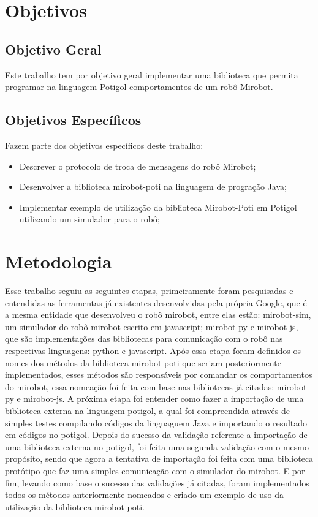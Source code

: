 \section{Objetivos}

\subsection{Objetivo Geral}

Este trabalho tem por objetivo geral implementar uma biblioteca que permita
programar na linguagem Potigol comportamentos de um robô Mirobot.

\subsection{Objetivos Específicos}

Fazem parte dos objetivos específicos deste trabalho:

\begin{itemize} \item Descrever o protocolo de troca de mensagens do robô
    Mirobot; \item Desenvolver a biblioteca mirobot-poti na linguagem de
    progração Java; \item Implementar exemplo de utilização da biblioteca
      Mirobot-Poti em Potigol utilizando um simulador para o robô;
\end{itemize}


\section{Metodologia}

Esse trabalho seguiu as seguintes etapas, primeiramente foram pesquisadas e
entendidas as ferramentas já existentes desenvolvidas pela própria Google, que
é a mesma entidade que desenvolveu o robô mirobot, entre elas estão:
mirobot-sim, um simulador do robô mirobot escrito em javascript; mirobot-py e
mirobot-js, que são implementações das bibliotecas para comunicação com o robô
nas respectivas linguagens: python e javascript. Após essa etapa foram
definidos os nomes dos métodos da biblioteca mirobot-poti que seriam
posteriormente implementados, esses métodos são responsáveis por comandar os
comportamentos do mirobot, essa nomeação foi feita com base nas bibliotecas já
citadas: mirobot-py e mirobot-js. A próxima etapa foi entender como fazer a
importação de uma biblioteca externa na linguagem potigol, a qual foi
compreendida através de simples testes compilando códigos da linguaguem Java e
importando o resultado em códigos no potigol. Depois do sucesso da validação
referente a importação de uma biblioteca externa no potigol, foi feita uma
segunda validação com o mesmo propósito, sendo que agora a tentativa de
importação foi feita com uma biblioteca protótipo que faz uma simples
comunicação com o simulador do mirobot. E por fim, levando como base o sucesso
das validações já citadas, foram implementados todos os métodos anteriormente
nomeados e criado um exemplo de uso da utilização da biblioteca mirobot-poti.

